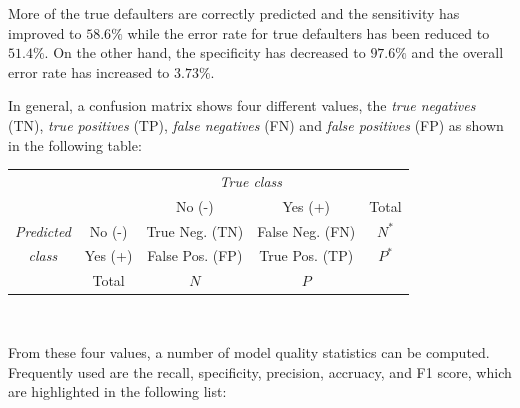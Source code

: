 More of the true defaulters are correctly predicted and the sensitivity has improved to $58.6\%$ while the error rate for true defaulters has been reduced to $51.4\%$. On the other hand, the specificity has decreased to $97.6\%$ and the overall error rate has increased to $3.73\%$. 

In general, a confusion matrix shows four different values, the \emph{true negatives} (TN), \emph{true positives} (TP), \emph{false negatives} (FN) and \emph{false positives} (FP) as shown in the following table:

\begin{center}
\renewcommand{\arraystretch}{1.25}

\begin{tabular}{cc|cc|c} \hline
     & & \multicolumn{2}{c|}{\emph{True class}} \\
     & & No (-) & Yes (+) & Total \\ \hline
\emph{Predicted} & No (-) & True Neg. (TN) & False Neg. (FN) & $N^*$ \\ 
\emph{class} & Yes (+) & False Pos. (FP) & True Pos. (TP) & $P^*$ \\ \hline
     & Total & $N$ & $P$ &  \\ \hline
\end{tabular} \\
\end{center}

From these four values, a number of model quality statistics can be computed. Frequently used are the recall, specificity, precision, accruacy, and F1 score, which are highlighted in the following list:

